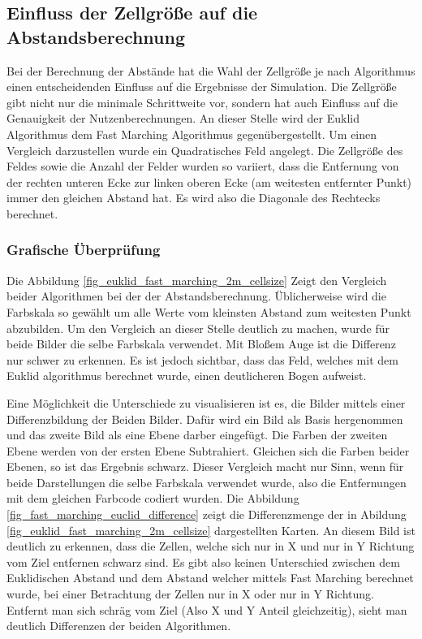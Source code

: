 \subsection{Einfluss der Zellgröße auf die Abstandsberechnung}
Bei der Berechnung der Abstände hat die Wahl der Zellgröße je nach Algorithmus einen entscheidenden Einfluss auf die Ergebnisse der Simulation. Die Zellgröße gibt nicht nur die minimale Schrittweite vor, sondern hat auch Einfluss auf die Genauigkeit der Nutzenberechnungen. An dieser Stelle wird der Euklid Algorithmus dem Fast Marching Algorithmus gegenübergestellt. Um einen Vergleich darzustellen wurde ein Quadratisches Feld angelegt. Die Zellgröße des Feldes sowie die Anzahl der Felder wurden so variiert, dass die Entfernung von der rechten unteren Ecke zur linken oberen Ecke (am weitesten entfernter Punkt) immer den gleichen Abstand hat. Es wird also die Diagonale des Rechtecks berechnet. 

\subsubsection{Grafische Überprüfung}
Die Abbildung \ref{fig_euklid_fast_marching_2m_cellsize} Zeigt den Vergleich beider Algorithmen bei der der Abstandsberechnung. Üblicherweise wird die Farbskala so gewählt um alle Werte vom kleinsten Abstand zum weitesten Punkt abzubilden. Um den Vergleich an dieser Stelle deutlich zu machen, wurde für beide Bilder die selbe Farbskala verwendet. Mit Bloßem Auge ist die Differenz nur schwer zu erkennen. Es ist jedoch sichtbar, dass das Feld, welches mit dem Euklid algorithmus berechnet wurde, einen deutlicheren Bogen aufweist. 

Eine Möglichkeit die Unterschiede zu visualisieren ist es, die Bilder mittels einer Differenzbildung der Beiden Bilder. Dafür wird ein Bild als Basis hergenommen und das zweite Bild als eine Ebene darber eingefügt. Die Farben der zweiten Ebene werden von der ersten Ebene Subtrahiert. Gleichen sich die Farben beider Ebenen, so ist das Ergebnis schwarz. Dieser Vergleich macht nur Sinn, wenn für beide Darstellungen die selbe Farbskala verwendet wurde, also die Entfernungen mit dem gleichen Farbcode codiert wurden. Die Abbildung \ref{fig_fast_marching_euclid_difference} zeigt die Differenzmenge der in Abildung \ref{fig_euklid_fast_marching_2m_cellsize} dargestellten Karten.
An diesem Bild ist deutlich zu erkennen, dass die Zellen, welche sich nur in X und nur in Y Richtung vom Ziel entfernen schwarz sind.  Es gibt also keinen Unterschied zwischen dem Euklidischen Abstand und dem Abstand welcher mittels Fast Marching berechnet wurde, bei einer Betrachtung der Zellen nur in X oder nur in Y Richtung. Entfernt man sich schräg vom Ziel (Also X und Y Anteil gleichzeitig), sieht man deutlich Differenzen der beiden Algorithmen. 

